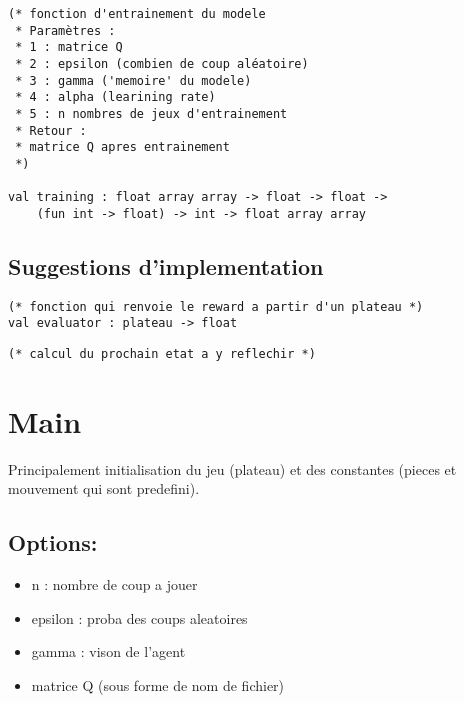 \documentclass{article}
\begin{document}
\begin{lstlisting}[frame=L]
(* fonction d'entrainement du modele
 * Paramètres :
 * 1 : matrice Q
 * 2 : epsilon (combien de coup aléatoire)
 * 3 : gamma ('memoire' du modele)
 * 4 : alpha (learining rate)
 * 5 : n nombres de jeux d'entrainement
 * Retour :
 * matrice Q apres entrainement
 *)

val training : float array array -> float -> float ->
	(fun int -> float) -> int -> float array array
\end{lstlisting}

\subsection{Suggestions d'implementation}

\begin{lstlisting}[frame=L]
(* fonction qui renvoie le reward a partir d'un plateau *)
val evaluator : plateau -> float
\end{lstlisting}

\begin{lstlisting}
(* calcul du prochain etat a y reflechir *)
\end{lstlisting}

\section{Main}

Principalement initialisation du jeu (plateau) et des constantes (pieces et
mouvement qui sont predefini).


\subsection{Options:}
\begin{itemize}
	\item n : nombre de coup a jouer
	\item epsilon : proba des coups aleatoires
	\item gamma : vison de l'agent
	\item matrice Q (sous forme de nom de fichier)
\end{itemize}
\end{document}
